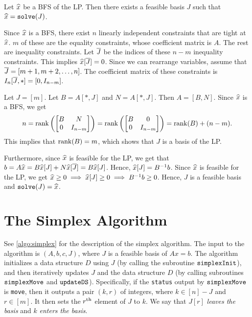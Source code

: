 \begin{lemma}
\label{thm:bfs-gives-basis}
Let $\widehat{x}$ be a BFS of the LP. Then there exists a feasible basis $J$
such that $\widehat{x} = \operatorname{\mathtt{solve}}(J)$.
\end{lemma}
\begin{longProof}
Since $\widehat{x}$ is a BFS, there exist $n$ linearly independent constraints that are tight at $\widehat{x}$.
$m$ of these are the equality constraints, whose coefficient matrix is $A$.
The rest are inequality constraints.
Let $\overline{J}$ be the indices of these $n-m$ inequality constraints.
This implies $\widehat{x}[\overline{J}] = 0$.
Since we can rearrange variables, assume \wLoG{} that $\overline{J} = [m+1, m+2, \ldots, n]$.
The coefficient matrix of these constraints is $I_n[\overline{J},*] = [0, I_{n-m}]$.

Let $J = [m]$. Let $B = A[*,J]$ and $N = A[*,J]$. Then $A = [B, N]$. Since $\widehat{x}$ is a BFS, we get
\[ n = \operatorname{rank}\left(\begin{bmatrix}B & N \\ 0 & I_{n-m}\end{bmatrix}\right)
= \operatorname{rank}\left(\begin{bmatrix}B & 0 \\ 0 & I_{n-m}\end{bmatrix}\right)
= \operatorname{rank}(B) + (n-m). \]
This implies that $\operatorname{rank}(B) = m$, which shows that $J$ is a basis of the LP.

Furthermore, since $\widehat{x}$ is feasible for the LP, we get that
$b = A\widehat{x} = B\widehat{x}[J] + N\widehat{x}[\overline{J}] = B\widehat{x}[J]$.
Hence, $\widehat{x}[J] = B^{-1}b$. Since $\widehat{x}$ is feasible for the LP,
we get $\widehat{x} \ge 0 \implies \widehat{x}[J] \ge 0 \implies B^{-1}b \ge 0$.
Hence, $J$ is a feasible basis and $\operatorname{\mathtt{solve}}(J) = \widehat{x}$.
\end{longProof}

\section{The Simplex Algorithm}

See \cref{algo:simplex} for the description of the simplex algorithm.
The input to the algorithm is $(A, b, c, J)$, where $J$ is a feasible basis of $Ax = b$.
The algorithm initializes a data structure $D$ using $J$
(by calling the subroutine $\operatorname{\mathtt{simplexInit}}$),
and then iteratively updates $J$ and the data structure $D$
(by calling subroutines $\operatorname{\mathtt{simplexMove}}$ and $\operatorname{\mathtt{updateDS}}$).
Specifically, if the \texttt{status} output by $\operatorname{\mathtt{simplexMove}}$ is \texttt{move},
then it outputs a pair $(k, r)$ of integers, where $k \in [n] - J$ and $r \in [m]$.
It then sets the $r^{\textrm{th}}$ element of $J$ to $k$.
We say that $J[r]$ \emph{leaves the basis} and $k$ \emph{enters the basis}.

